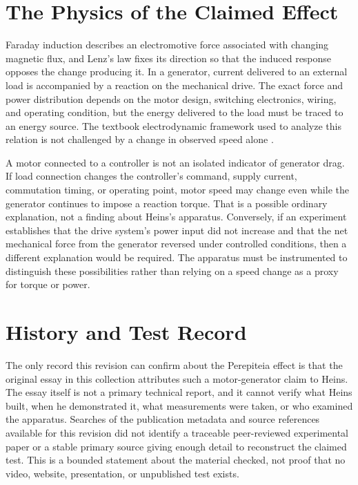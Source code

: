 \documentclass[11pt]{article}
\begin{document}
\section{The Physics of the Claimed Effect}

Faraday induction describes an electromotive force associated with changing magnetic flux, and Lenz's law fixes its direction so that the induced response opposes the change producing it. In a generator, current delivered to an external load is accompanied by a reaction on the mechanical drive. The exact force and power distribution depends on the motor design, switching electronics, wiring, and operating condition, but the energy delivered to the load must be traced to an energy source. The textbook electrodynamic framework used to analyze this relation is not challenged by a change in observed speed alone \cite{Jackson1999}.

A motor connected to a controller is not an isolated indicator of generator drag. If load connection changes the controller's command, supply current, commutation timing, or operating point, motor speed may change even while the generator continues to impose a reaction torque. That is a possible ordinary explanation, not a finding about Heins's apparatus. Conversely, if an experiment establishes that the drive system's power input did not increase and that the net mechanical force from the generator reversed under controlled conditions, then a different explanation would be required. The apparatus must be instrumented to distinguish these possibilities rather than relying on a speed change as a proxy for torque or power.

\section{History and Test Record}

The only record this revision can confirm about the Perepiteia effect is that the original essay in this collection attributes such a motor-generator claim to Heins. The essay itself is not a primary technical report, and it cannot verify what Heins built, when he demonstrated it, what measurements were taken, or who examined the apparatus. Searches of the publication metadata and source references available for this revision did not identify a traceable peer-reviewed experimental paper or a stable primary source giving enough detail to reconstruct the claimed test. This is a bounded statement about the material checked, not proof that no video, website, presentation, or unpublished test exists.
\end{document}
